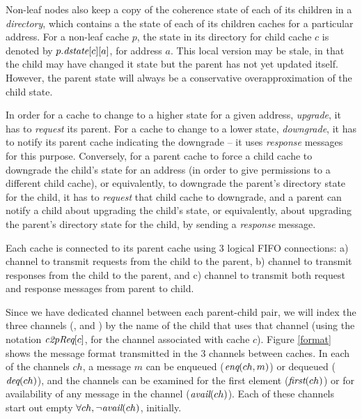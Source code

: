 Non-leaf nodes also keep a copy of the coherence state of each of its
children in a \emph{directory}, which contains a the state of each of
its children caches for a particular address.  For a non-leaf cache
$p$, the state in its directory for child cache $c$ is denoted by
$p.\textit{dstate}[c][a]$, for address $a$. This local version may
be stale, in that the child may have changed it state but the parent
has not yet updated itself. However, the parent state will always be a
conservative overapproximation of the child state.

In order for a cache to change to a higher state for a given address,
\ie{} \emph{upgrade}, it has to \emph{request} its parent.  For a
cache to change to a lower state, \ie \emph{downgrade}, it has to
notify its parent cache indicating the downgrade -- it uses
\emph{response} messages for this purpose. Conversely, for a parent
cache to force a child cache to downgrade the child's state for an
address (in order to give permissions to a different child cache), or
equivalently, to downgrade the parent's directory state for the child,
it has to \emph{request} that child cache to downgrade, and a parent
can notify a child about upgrading the child's state, or equivalently,
about upgrading the parent's directory state for the child, by sending
a \emph{response} message.

Each cache is connected to its parent cache using 3 logical FIFO
connections: a) \cpReq{} channel to transmit requests from the child
to the parent, b) \cpResp{} channel to transmit responses from the
child to the parent, and c) \pc{} channel to transmit both request and
response messages from parent to child. 

Since we have dedicated channel between each parent-child pair, we
will index the three channels (\cpReq{}, \cpResp{} and \pc{}) by the
name of the child that uses that channel (using the notation
$\textit{c2pReq}[c]$, \etc for the \cpReq{} channel associated with cache $c$).
Figure \ref{format} shows the message format transmitted in the 3
channels between caches. In each of the channels $ch$, a message $m$
can be enqueued ($\textit{enq}(ch, m)$) or dequeued ($\textit{deq}(ch)$), and the
channels can be examined for the first element ($\textit{first}(ch)$) or for
availability of any message in the channel ($\textit{avail}(ch)$).  Each of
these channels start out empty \ie $\forall ch, \neg \textit{avail}(ch)$,
initially.

